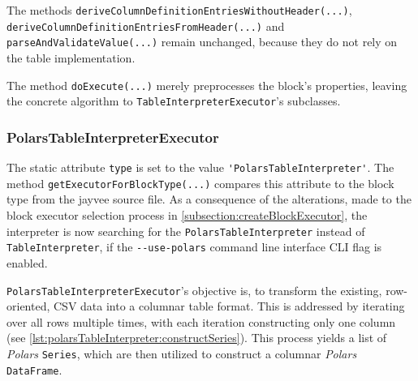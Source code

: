 

The methods \Verb|deriveColumnDefinitionEntriesWithoutHeader(...)|, \Verb|deriveColumnDefinitionEntriesFromHeader(...)| and \Verb|parseAndValidateValue(...)| remain unchanged, because they do not rely on the table implementation.

The method \Verb|doExecute(...)| merely preprocesses the block's properties, leaving the concrete algorithm to \Verb|TableInterpreterExecutor|'s subclasses.

\subsubsection{PolarsTableInterpreterExecutor}
The static attribute \Verb|type| is set to the value \Verb|'PolarsTableInterpreter'|.
The method \Verb|getExecutorForBlockType(...)| compares this attribute to the block type from the jayvee source file.
As a consequence of the alterations, made to the block executor selection process in \autoref{subsection:createBlockExecutor}, the interpreter is now searching for the \Verb|PolarsTableInterpreter| instead of \Verb|TableInterpreter|, if the \Verb|--use-polars| command line interface \ac{CLI} flag is enabled.

\Verb|PolarsTableInterpreterExecutor|'s objective is, to transform the existing, row-oriented, \ac{CSV} data into a columnar table format.
This is addressed by iterating over all rows multiple times, with each iteration constructing only one column (see \autoref{lst:polarsTableInterpreter:constructSeries}).
This process yields a list of \emph{Polars} \Verb|Series|, which are then utilized to construct a columnar \emph{Polars} \Verb|DataFrame|.

